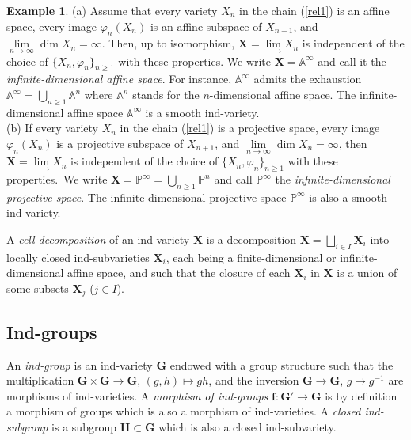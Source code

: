 \documentclass[12pt]{amsart}
\theoremstyle{definition}
\newtheorem{example}{Example}
\begin{document}
\begin{example}
\label{example1} {\rm (a)} Assume that every variety $X_n$ in the chain (\ref{rel1}) is an affine space, every image $\varphi_n(X_n)$ is an affine subspace of $X_{n+1}$, and $\lim\limits_{n\to\infty}\dim X_n=\infty$. Then, up to isomorphism,
$\mathbf{X}=\lim\limits_{\to}X_n$ is independent of the choice of $\{X_n,\varphi_n\}_{n\geq 1}$ with these properties. We write $\mathbf{X}=\mathbb{A}^\infty$ and call it the {\em infinite-dimensional affine space}.
For instance, $\mathbb{A}^\infty$ admits the exhaustion $\mathbb{A}^\infty=\bigcup_{n\geq 1}\mathbb{A}^n$ where $\mathbb{A}^n$ stands for the $n$-dimensional affine space. The infinite-dimensional affine space $\mathbb{A}^\infty$ is a smooth ind-variety. \\
{\rm (b)} If every variety $X_n$ in the chain (\ref{rel1}) is a projective space, every image $\varphi_n(X_n)$ is a projective subspace of $X_{n+1}$, and $\lim\limits_{n\to\infty}\dim X_n=\infty$, then $\mathbf{X}=\lim\limits_\to X_n$ is independent of the choice of $\{X_n,\varphi_n\}_{n\geq 1}$ with these properties.\ We write $\mathbf{X}=\mathbb{P}^\infty=\bigcup_{n\geq 1}\mathbb{P}^n$ and call $\mathbb{P}^\infty$ the {\em infinite-dimensional projective space}. The infinite-dimensional projective space $\mathbb{P}^\infty$ is also a smooth ind-variety.
\end{example}


A {\em cell decomposition} of an ind-variety $\mathbf{X}$ is a decomposition
$\mathbf{X}=\bigsqcup_{i\in I} \mathbf{X}_i$ into locally closed ind-subvarieties
$\mathbf{X}_i$, each being a finite-dimensional or infinite-dimensional affine space, and such that the
closure of each $\mathbf{X}_i$ in $\mathbf{X}$ is a union of some subsets $\mathbf{X}_j$ ($j\in I$).

\subsection{Ind-groups}

\label{section-2-2}
An {\em ind-group} is an ind-variety $\mathbf{G}$ endowed with a group structure such that the multiplication $\mathbf{G}\times\mathbf{G}\to\mathbf{G}$, $(g,h)\mapsto gh$, and the inversion $\mathbf{G}\to\mathbf{G}$, $g\mapsto g^{-1}$ are morphisms of ind-varieties. A {\em morphism of ind-groups} $\mathbf{f}:\mathbf{G}'\to\mathbf{G}$  is by definition a morphism of groups which is also a morphism of ind-varieties. A {\em closed ind-subgroup} is a subgroup $\mathbf{H}\subset\mathbf{G}$ which is also a closed ind-subvariety.
\end{document}
